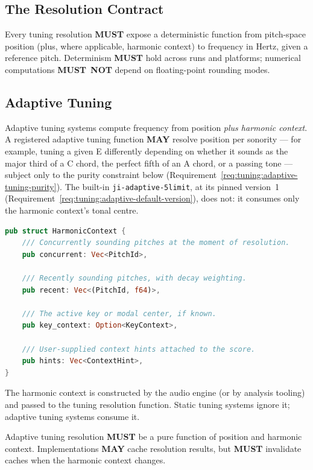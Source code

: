 \documentclass[11pt,letterpaper]{report}
\newcounter{requirement}[chapter]
\newcommand{\MUST}{\textbf{MUST}}
\newcommand{\MUSTNOT}{\textbf{MUST}\nobreak\ \textbf{NOT}}
\newcommand{\MAY}{\textbf{MAY}}
\begin{document}
\subsection{The Resolution Contract}

\begin{requirement}
  \label{req:tuning:tuning-resolution-determinism}
  Every tuning resolution \MUST{} expose a deterministic function from
  pitch-space position (plus, where applicable, harmonic context) to
  frequency in Hertz, given a reference pitch. Determinism \MUST{}
  hold across runs and platforms; numerical computations \MUSTNOT{}
  depend on floating-point rounding modes.
\end{requirement}

\subsection{Adaptive Tuning}

Adaptive tuning systems compute frequency from position \emph{plus
harmonic context}. A registered adaptive tuning function \MAY{}
resolve position per sonority --- for example, tuning a given E
differently depending on whether it sounds as the major third of a C
chord, the perfect fifth of an A chord, or a passing tone --- subject
only to the purity constraint below
(Requirement~\ref{req:tuning:adaptive-tuning-purity}). The built-in
\texttt{ji-adaptive-5limit}, at its pinned version~1
(Requirement~\ref{req:tuning:adaptive-default-version}), does not: it
consumes only the harmonic context's tonal centre.

\begin{lstlisting}[language=Rust]
pub struct HarmonicContext {
    /// Concurrently sounding pitches at the moment of resolution.
    pub concurrent: Vec<PitchId>,

    /// Recently sounding pitches, with decay weighting.
    pub recent: Vec<(PitchId, f64)>,

    /// The active key or modal center, if known.
    pub key_context: Option<KeyContext>,

    /// User-supplied context hints attached to the score.
    pub hints: Vec<ContextHint>,
}
\end{lstlisting}

The harmonic context is constructed by the audio engine (or by analysis
tooling) and passed to the tuning resolution function. Static tuning
systems ignore it; adaptive tuning systems consume it.

\begin{requirement}
  \label{req:tuning:adaptive-tuning-purity}
  Adaptive tuning resolution \MUST{} be a pure function of position
  and harmonic context. Implementations \MAY{} cache resolution
  results, but \MUST{} invalidate caches when the harmonic context
  changes.
\end{requirement}
\end{document}
